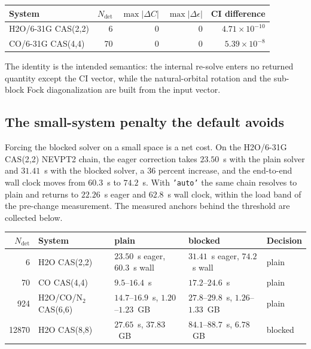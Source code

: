 \begin{center}
\begin{tabular}{lrrrr}
\toprule
System & $N_{\mathrm{det}}$ & $\max|\Delta C|$ & $\max|\Delta\epsilon|$
  & CI difference \\
\midrule
H2O/6-31G CAS(2,2) & 6 & $0$ & $0$ & $4.71\times10^{-10}$ \\
CO/6-31G CAS(4,4) & 70 & $0$ & $0$ & $5.39\times10^{-8}$ \\
\bottomrule
\end{tabular}
\end{center}

The identity is the intended semantics: the internal re-solve enters
no returned quantity except the CI vector, while the natural-orbital
rotation and the sub-block Fock diagonalization are built from the
input vector.

\subsection{The small-system penalty the default avoids}

Forcing the blocked solver on a small space is a net cost.  On the
H2O/6-31G CAS(2,2) NEVPT2 chain, the eager correction takes
$23.50$~s with the plain solver and $31.41$~s with the blocked solver,
a $36$ percent increase, and the end-to-end wall clock moves from
$60.3$~s to $74.2$~s.  With \texttt{'auto'} the same chain resolves to
plain and returns to $22.26$~s eager and $62.8$~s wall clock, within
the load band of the pre-change measurement.  The measured anchors
behind the threshold are collected below.

\begin{center}
\small
\begin{tabular}{r l p{} p{} l}
\toprule
$N_{\mathrm{det}}$ & System & plain & blocked & Decision \\
\midrule
6 & H2O CAS(2,2) & $23.50$~s eager, $60.3$~s wall
  & $31.41$~s eager, $74.2$~s wall & plain \\
70 & CO CAS(4,4) & $9.5$--$16.4$~s & $17.2$--$24.6$~s & plain \\
924 & H2O/CO/N$_2$ CAS(6,6) & $14.7$--$16.9$~s, $1.20$--$1.23$~GB
  & $27.8$--$29.8$~s, $1.26$--$1.33$~GB & plain \\
12870 & H2O CAS(8,8) & $27.65$~s, $37.83$~GB
  & $84.1$--$88.7$~s, $6.78$~GB & blocked \\
\bottomrule
\end{tabular}
\end{center}


